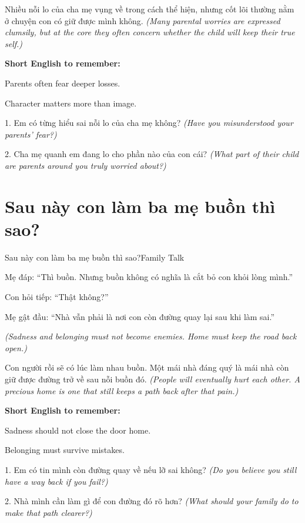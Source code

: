 \begin{baihoc}
Nhiều nỗi lo của cha mẹ vụng về trong cách thể hiện, nhưng cốt lõi thường nằm ở chuyện con có giữ được mình không.
\textit{(Many parental worries are expressed clumsily, but at the core they often concern whether the child will keep their true self.)}
\end{baihoc}

\begin{ghinhoanh}
\textbf{Short English to remember:}

Parents often fear deeper losses.

Character matters more than image.
\end{ghinhoanh}

\begin{tuhocnhanh}
1. Em có từng hiểu sai nỗi lo của cha mẹ không? \textit{(Have you misunderstood your parents' fear?)}

2. Cha mẹ quanh em đang lo cho phần nào của con cái? \textit{(What part of their child are parents around you truly worried about?)}
\end{tuhocnhanh}
\ngancach

\section{Sau này con làm ba mẹ buồn thì sao?}
\begin{truyen}{Sau này con làm ba mẹ buồn thì sao?}{Family Talk}

Mẹ đáp: ``Thì buồn. Nhưng buồn không có nghĩa là cắt bỏ con khỏi lòng mình.''

Con hỏi tiếp: ``Thật không?''

Mẹ gật đầu: ``Nhà vẫn phải là nơi con còn đường quay lại sau khi làm sai.''

\textit{(Sadness and belonging must not become enemies. Home must keep the road back open.)}
\end{truyen}

\begin{baihoc}
Con người rồi sẽ có lúc làm nhau buồn. Một mái nhà đáng quý là mái nhà còn giữ được đường trở về sau nỗi buồn đó.
\textit{(People will eventually hurt each other. A precious home is one that still keeps a path back after that pain.)}
\end{baihoc}

\begin{ghinhoanh}
\textbf{Short English to remember:}

Sadness should not close the door home.

Belonging must survive mistakes.
\end{ghinhoanh}

\begin{tuhocnhanh}
1. Em có tin mình còn đường quay về nếu lỡ sai không? \textit{(Do you believe you still have a way back if you fail?)}

2. Nhà mình cần làm gì để con đường đó rõ hơn? \textit{(What should your family do to make that path clearer?)}
\end{tuhocnhanh}
\ngancach